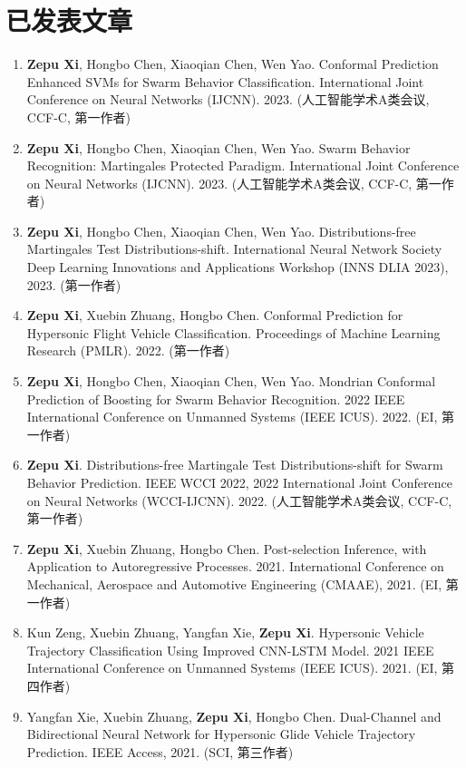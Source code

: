 \section*{已发表文章}
\begin{enumerate}
\item 
\textbf{Zepu Xi}, Hongbo Chen, Xiaoqian Chen, Wen Yao. 
Conformal Prediction Enhanced SVMs for Swarm Behavior Classification. 
International Joint Conference on Neural Networks (IJCNN). 2023. (人工智能学术A类会议, CCF-C, 第一作者) 
\item 
\textbf{Zepu Xi}, Hongbo Chen, Xiaoqian Chen, Wen Yao. 
Swarm Behavior Recognition: Martingales Protected Paradigm. 
International Joint Conference on Neural Networks (IJCNN). 2023. (人工智能学术A类会议, CCF-C, 第一作者)
\item 
\textbf{Zepu Xi}, Hongbo Chen, Xiaoqian Chen, Wen Yao. 
Distributions-free Martingales Test Distributions-shift. 
International Neural Network Society Deep Learning Innovations and Applications Workshop (INNS DLIA 2023), 2023. (第一作者)
\item 
\textbf{Zepu Xi}, Xuebin Zhuang, Hongbo Chen. 
Conformal Prediction for Hypersonic Flight Vehicle Classification. 
Proceedings of Machine Learning Research (PMLR). 2022. (第一作者)
\item 
\textbf{Zepu Xi}, Hongbo Chen, Xiaoqian Chen, Wen Yao. 
Mondrian Conformal Prediction of Boosting for Swarm Behavior Recognition. 
2022 IEEE International Conference on Unmanned Systems ({IEEE ICUS}). 2022. (EI, 第一作者)
\item 
\textbf{Zepu Xi}. 
Distributions-free Martingale Test Distributions-shift for Swarm Behavior Prediction. 
IEEE WCCI 2022, 2022 International Joint Conference on Neural Networks (WCCI-IJCNN). 2022. (人工智能学术A类会议, CCF-C, 第一作者)
\item 
\textbf{Zepu Xi}, Xuebin Zhuang, Hongbo Chen. 
Post-selection Inference, with Application to Autoregressive Processes. 2021. 
International Conference on Mechanical, Aerospace and Automotive Engineering (CMAAE), 2021. (EI, 第一作者)
\item 
Kun Zeng, Xuebin Zhuang, Yangfan Xie, \textbf{Zepu Xi}. 
Hypersonic Vehicle Trajectory Classification Using Improved CNN-LSTM Model. 
2021 IEEE International Conference on Unmanned Systems (IEEE ICUS). 2021. (EI, 第四作者)
\item 
Yangfan Xie, Xuebin Zhuang, \textbf{Zepu Xi}, Hongbo Chen. 
Dual-Channel and Bidirectional Neural Network for Hypersonic Glide Vehicle Trajectory Prediction. 
IEEE Access, 2021. (SCI, 第三作者)
\end{enumerate}

